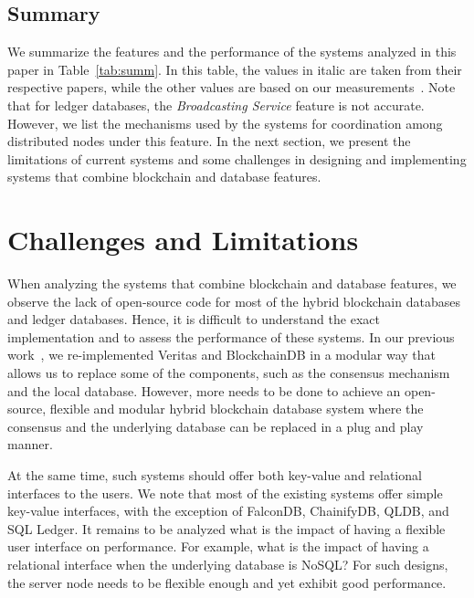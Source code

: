 \documentclass[11pt]{article}
\begin{document}

\subsection{Summary}

We summarize the features and the performance of the systems analyzed in this paper in Table~\ref{tab:summ}. In this table, the values in italic are taken from their respective papers, while the other values are based on our measurements~\cite{loghin_vldb2022, loghin_green2022}. Note that for ledger databases, the \textit{Broadcasting Service} feature is not accurate. However, we list the mechanisms used by the systems for coordination among distributed nodes under this feature. In the next section, we present the limitations of current systems and some challenges in designing and implementing systems that combine blockchain and database features.

\section{Challenges and Limitations}
\label{sec:challenges}

When analyzing the systems that combine blockchain and database features, we observe the lack of open-source code for most of the hybrid blockchain databases and ledger databases. Hence, it is difficult to understand the exact implementation and to assess the performance of these systems. In our previous work~\cite{loghin_vldb2022}, we re-implemented Veritas and BlockchainDB in a modular way that allows us to replace some of the components, such as the consensus mechanism and the local database. However, more needs to be done to achieve an open-source, flexible and modular hybrid blockchain database system where the consensus and the underlying database can be replaced in a plug and play manner.

At the same time, such systems should offer both key-value and relational interfaces to the users. We note that most of the existing systems offer simple key-value interfaces, with the exception of FalconDB, ChainifyDB, QLDB, and SQL Ledger. It remains to be analyzed what is the impact of having a flexible user interface on performance. For example, what is the impact of having a relational interface when the underlying database is NoSQL? For such designs, the server node needs to be flexible enough and yet exhibit good performance.
\end{document}
